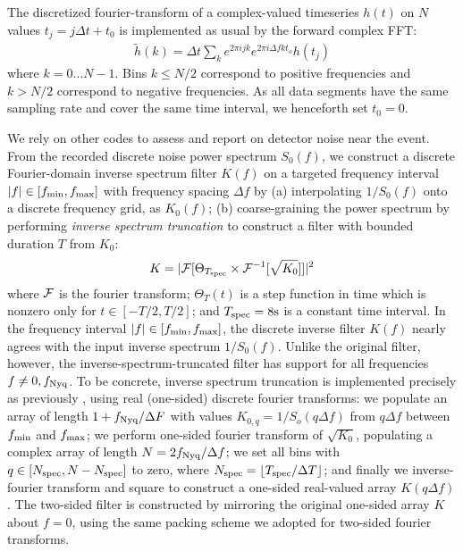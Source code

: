 \documentclass[twocolumn,prd,nofootinbib]{revtex4}
\DeclarePairedDelimiter\floor{\lfloor}{\rfloor}
\newcommand\unit[1]{{\rm #1}}
\begin{document}
The discretized fourier-transform of a complex-valued timeseries $h(t)$ on $N$  values $t_j=j\Delta t+t_0$ is
implemented as usual by the forward complex FFT:
\begin{eqnarray}
\tilde{h}(k) = \Delta t  \sum_k e^{2\pi i j k} e^{2\pi i \Delta f k t_o} h(t_j)
\end{eqnarray}
where $k=0\ldots N-1$.  Bins $k\le N/2$ correspond to positive frequencies and $k>N/2$ correspond to  negative
frequencies.    As all data segments  have the same sampling rate and cover the same time interval, we henceforth set $t_0=0$.  
% 

We rely on other codes to assess and report on detector noise near the event.   From the recorded discrete noise power
spectrum $S_0(f)$, we construct a discrete Fourier-domain inverse spectrum filter $K(f)$ on a targeted frequency interval $|f|
\in [f_{\rm min}, f_{\rm max}]$ with frequency spacing $\Delta f$ by 
(a) interpolating $1/S_0(f)$ onto a discrete frequency grid, as $K_0(f)$; 
(b) coarse-graining the power spectrum by performing \emph{inverse spectrum truncation} \cite{2012PhRvD..85l2006A} to construct a filter with bounded duration $T$ from $K_0$:
\begin{eqnarray}
 K =  |{\cal F} [\Theta_{T_{\rm spec}} \times {\cal F}^{-1}[ \sqrt{K_0} ]]|^2
\end{eqnarray}
where ${\cal F}$ is the fourier transform; $\Theta_T(t)$ is a step function in time which is nonzero only for $t\in[-T/2,T/2]$; and $T_{\rm spec}=8\unit{s}$ is a
constant time interval. 
%
In the frequency interval $|f|\in[f_{\rm min},f_{\rm max}]$, the discrete inverse filter $K(f)$ nearly agrees with the
input inverse spectrum $1/S_0(f)$.  Unlike the original filter, however, the inverse-spectrum-truncated filter has
support for all frequencies $f\ne 0,f_{\rm Nyq}$.     
%
To be concrete, inverse spectrum truncation is implemented precisely as previously  \cite{2012PhRvD..85l2006A}, using
real (one-sided) discrete fourier transforms: 
%
we populate an array of length $1+f_{\rm Nyq}/\Delta F$ with values $K_{0,q} =1/S_o(q \Delta f)$ from $q\Delta f$ between $f_{\rm min}$ and $f_{\rm max}$; 
we perform one-sided fourier transform of $\sqrt{K_{0}}$, populating a complex array of length $N=2 f_{\rm Nyq}/\Delta f$; 
we set all bins with $q\in [N_{\rm spec}, N-N_{\rm spec}]$ to zero, where $N_{\rm spec} = \floor*{T_{\rm spec}/\Delta
  T}$; 
and  finally we inverse-fourier transform and square to construct a one-sided real-valued array $K(q\Delta f)$.  
%
The two-sided filter is constructed by mirroring the original one-sided array $K$ about $f=0$, using the same packing
scheme we adopted for two-sided fourier transforms.  
\end{document}
